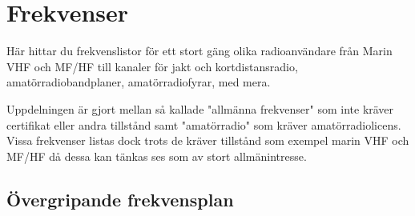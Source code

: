 
\chapter{Frekvenser}

Här hittar du frekvenslistor för ett stort gäng olika radioanvändare från
Marin VHF och MF/HF till kanaler för jakt och kortdistansradio,
amatörradiobandplaner, amatörradiofyrar, med mera.

Uppdelningen är gjort mellan så kallade "allmänna frekvenser" som inte kräver
certifikat eller andra tillstånd samt "amatörradio" som kräver
amatörradiolicens. Vissa frekvenser listas dock trots de kräver tillstånd som
exempel marin VHF och MF/HF då dessa kan tänkas ses som av stort
allmänintresse.

\clearpage

\section{Övergripande frekvensplan}

